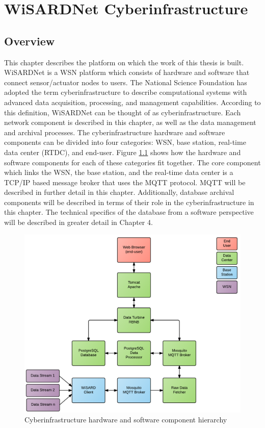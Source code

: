 
\chapter{WiSARDNet Cyberinfrastructure} %
\label{Chapter 3}
\lhead{} %

\section{Overview}
This chapter describes the platform on which the work of this thesis is built. WiSARDNet is a WSN platform which consists of hardware and software that connect sensor/actuator nodes to users. The National Science Foundation has adopted the term cyberinfrastructure to describe computational systems with advanced data acquisition, processing, and management capabilities. According to this definition, WiSARDNet can be thought of as cyberinfrastructure. Each network component is described in this chapter, as well as the data management and archival processes. The cyberinfrastructure hardware and software components can be divided into four categories: WSN, base station, real-time data center (RTDC), and end-user. Figure \ref{fig:device_hierarchy} shows how the hardware and software components for each of these categories fit together. The core component which links the WSN, the base station, and the real-time data center is a TCP/IP based message broker that uses the MQTT protocol. MQTT will be described in further detail in this chapter. Additionally, database archival components will be described in terms of their role in the cyberinfrastructure in this chapter. The technical specifics of the database from a software perspective will be described in greater detail in Chapter 4.

\begin{figure}[htbp]
	\centering
	\includegraphics[width=\textwidth]{figures/WiSARDNet_architecture.png}
	\caption{Cyberinfrastructure hardware and software component hierarchy}
	\label{fig:device_hierarchy}
\end{figure}

